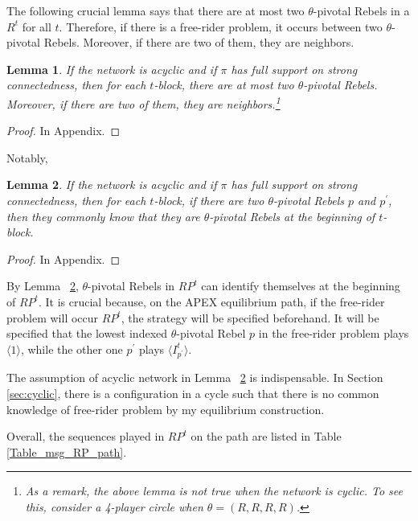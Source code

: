 \documentclass[12pt,letter]{article}
\newtheorem{lemma}{Lemma}[section]
\theoremstyle{definition}
\theoremstyle{remark}
\theoremstyle{claim}
\begin{document}
The following crucial lemma says that there are at most two $\theta$-pivotal Rebels in a $R^{t}$ for all $t$. Therefore, if there is a free-rider problem, it occurs between two $\theta$-pivotal Rebels. Moreover, if there are two of them, they are neighbors.
\begin{lemma}
\label{lemma_at_most_two_nodes}
If the network is acyclic and if $\pi$ has full support on strong connectedness, then for each $t$-block, there are at most two $\theta$-pivotal Rebels. Moreover, if there are two of them, they are neighbors.\footnote{As a remark, the above lemma is not true when the network is cyclic. To see this, consider a 4-player circle when $\theta=(R,R,R,R)$.}
\end{lemma}
\begin{proof}
In Appendix.
\end{proof}

Notably,

\begin{lemma}
\label{lemman_pivotals_CK}
If the network is acyclic and if $\pi$ has full support on strong connectedness, then for each $t$-block, if there are two $\theta$-pivotal Rebels $p$ and $p^{'}$, then they commonly know that they are $\theta$-pivotal Rebels at the beginning of $t$-block.
\end{lemma}
\begin{proof}
In Appendix.
\end{proof}

By Lemma ~\ref{lemman_pivotals_CK}, $\theta$-pivotal Rebels in $RP^t$ can identify themselves at the beginning of $RP^t$. It is crucial because, on the APEX equilibrium path, if the free-rider problem will occur $RP^t$, the strategy will be specified beforehand. It will be specified that the lowest indexed $\theta$-pivotal Rebel $p$ in the free-rider problem plays $\langle 1 \rangle$, while the other one $p^{'}$ plays $\langle I^t_{p^{'}} \rangle$. 

The assumption of acyclic network in Lemma ~\ref{lemman_pivotals_CK} is indispensable. In Section \ref{sec:cyclic}, there is a configuration in a cycle such that there is no common knowledge of free-rider problem by my equilibrium construction. 

Overall, the sequences played in $RP^t$ on the path are listed in Table \ref{Table_msg_RP_path}.
\end{document}
